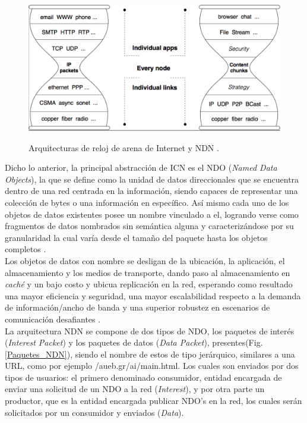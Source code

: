 \documentclass[12pt]{ociamthesis}  %
\begin{document}
	\begin{figure}[!htb]
		\centering
		\includegraphics[width=12cm]{Imagenes/Protocolo_IP_vs_NDN.png}\\
		\caption{Arquitecturas de reloj de arena de Internet y NDN \cite{named_data_networking}.}
		\label{Arq_reloj_arena}
	\end{figure}

Dicho lo anterior, la principal abstracción de ICN es el NDO (\textit{Named Data Objects}), la que se define como la unidad de datos direccionales que se encuentra dentro de una red centrada en la información, siendo capaces de representar una colección de bytes o una información en específico. Así mismo cada uno de los objetos de datos existentes posee un nombre vinculado a el, logrando verse como fragmentos de datos nombrados sin semántica alguna y caracterizándose por su granularidad la cual varía desde el tamaño del paquete hasta los objetos completos \cite{kutscher2016information}\cite{ahlgren2012survey}.\\

Los objetos de datos con nombre se desligan de la ubicación, la aplicación, el almacenamiento y los medios de transporte, dando paso al almacenamiento en \textit{caché} y un bajo costo y ubicua replicación en la red, esperando como resultado una mayor eficiencia y seguridad, una mayor escalabilidad respecto a la demanda de información/ancho de banda y una superior robustez en escenarios de comunicación desafiantes \cite{kutscher2016information}.\\

La arquitectura NDN se compone de dos tipos de NDO, los paquetes de interés (\textit{Interest Packet}) y los paquetes de datos (\textit{Data Packet}), presentes(Fig. \ref{Paquetes_NDN}), siendo el nombre de estos de tipo jerárquico, similares a una URL, como por ejemplo /aueb.gr/ai/main.html. Los cuales son enviados por dos tipos de usuarios: el primero denominado consumidor, entidad encargada de enviar una solicitud de un NDO a la red (\textit{Interest}), y por otra parte un productor, que es la entidad encargada publicar NDO's en la red, los cuales serán solicitados por un consumidor y enviados (\textit{Data}).\\
\end{document}
